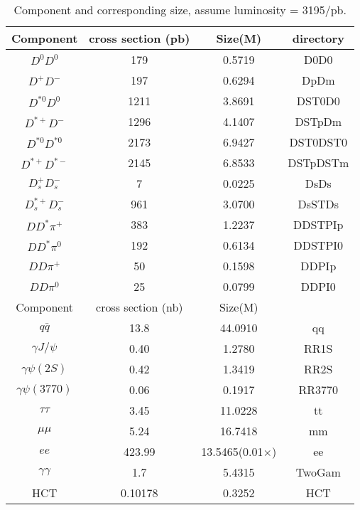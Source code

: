 \begin{table}[htp]
\begin{center}
\caption{Component and corresponding size, assume luminosity = 3195/pb.}
\begin{tabular}{c|c|c|c} \hline
Component        & cross section (pb) & Size(M) & directory \\ \hline
$D^{0}D^{0}$     &        179         & 0.5719  &  D0D0 \\
$D^{+}D^{-}$     &        197         & 0.6294  &  DpDm \\
$D^{*0}D^{0}$    &       1211         & 3.8691  &  DST0D0 \\
$D^{*+}D^{-}$    &       1296         & 4.1407  &  DSTpDm \\
$D^{*0}D^{*0}$   &       2173         & 6.9427  &  DST0DST0 \\
$D^{*+}D^{*-}$   &       2145         & 6.8533  &  DSTpDSTm \\
$D_{s}^{+}D_{s}^{-}$ &      7         & 0.0225  &  DsDs \\
$D_{s}^{*+}D_{s}^{-}$ &   961         & 3.0700  &  DsSTDs \\
\hline
$DD^{*}\pi^{+}$  &        383         & 1.2237  &  DDSTPIp \\
$DD^{*}\pi^{0}$  &        192         & 0.6134  &  DDSTPI0 \\
$DD\pi^{+}$      &         50         & 0.1598  &  DDPIp \\
$DD\pi^{0}$      &         25         & 0.0799  &  DDPI0 \\
\hline
Component        &  cross section (nb)& Size(M)\\ \hline
$q\bar{q}$       &       13.8         & 44.0910  & qq \\
$\gamma J/\psi$  &        0.40        &  1.2780  & RR1S \\
$\gamma \psi(2S)$&        0.42        &  1.3419  & RR2S \\
$\gamma \psi(3770)$ &     0.06        &  0.1917  & RR3770 \\
$\tau \tau$      &        3.45        & 11.0228  & tt \\
$\mu \mu$        &        5.24        & 16.7418  & mm \\
$ee$             &      423.99        & 13.5465(0.01$\times$)  & ee\\
$\gamma \gamma$  &        1.7         &  5.4315   & TwoGam \\
HCT              &        0.10178     &  0.3252   & HCT \\
\hline
\end{tabular}
\label{tab:genMC}
\end{center}
\end{table}

